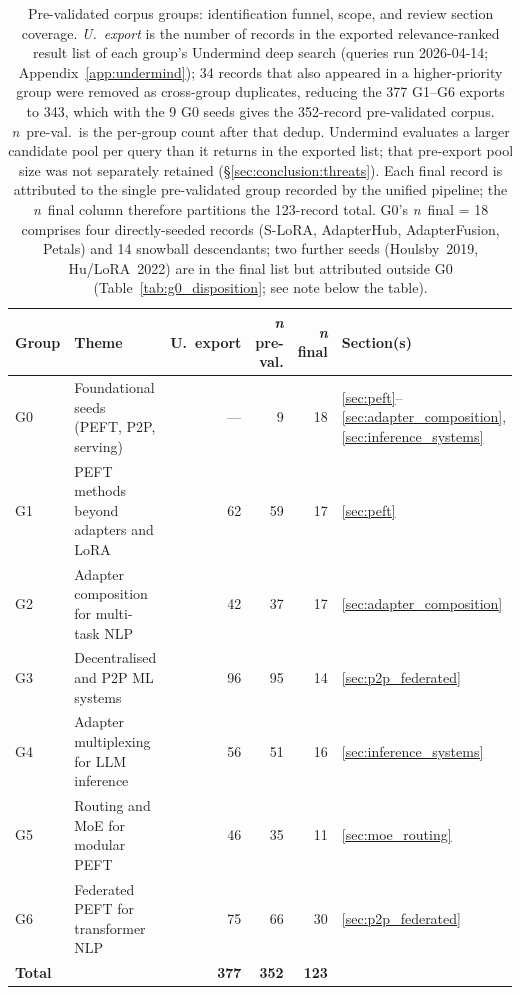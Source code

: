 \begin{table}[H]
\centering
\caption{Pre-validated corpus groups: identification funnel, scope, and review section coverage. \emph{U.\ export} is the number of records in the exported relevance-ranked result list of each group's Undermind deep search (queries run 2026-04-14; Appendix~\ref{app:undermind}); 34 records that also appeared in a higher-priority group were removed as cross-group duplicates, reducing the 377 G1--G6 exports to 343, which with the 9 G0 seeds gives the 352-record pre-validated corpus. \emph{n}~pre-val.\ is the per-group count after that dedup. Undermind evaluates a larger candidate pool per query than it returns in the exported list; that pre-export pool size was not separately retained (\S\ref{sec:conclusion:threats}). Each final record is attributed to the single pre-validated group recorded by the unified pipeline; the \emph{n}~final column therefore partitions the 123-record total. G0's \emph{n}~final = 18 comprises four directly-seeded records (S-LoRA, AdapterHub, AdapterFusion, Petals) and 14 snowball descendants; two further seeds (Houlsby~2019, Hu/LoRA~2022) are in the final list but attributed outside G0 (Table~\ref{tab:g0_disposition}; see note below the table).}
\label{tab:groups}
\begin{tabular}{lp{4.4cm}rrrl}
\toprule
\textbf{Group} & \textbf{Theme} & \textbf{U.\ export} & \textbf{\textit{n} pre-val.} &
\textbf{\textit{n} final} & \textbf{Section(s)} \\
\midrule
G0 & Foundational seeds (PEFT, P2P, serving) & ---  & 9   & 18  &
\ref{sec:peft}--\ref{sec:adapter_composition}, \ref{sec:inference_systems} \\
G1 & PEFT methods beyond adapters and LoRA   & 62  & 59  & 17  & \ref{sec:peft} \\
G2 & Adapter composition for multi-task NLP  & 42  & 37  & 17  &
\ref{sec:adapter_composition} \\
G3 & Decentralised and P2P ML systems        & 96  & 95  & 14  &
\ref{sec:p2p_federated} \\
G4 & Adapter multiplexing for LLM inference  & 56  & 51  & 16  &
\ref{sec:inference_systems} \\
G5 & Routing and MoE for modular PEFT        & 46  & 35  & 11  &
\ref{sec:moe_routing} \\
G6 & Federated PEFT for transformer NLP      & 75  & 66  & 30  &
\ref{sec:p2p_federated} \\
\midrule
\textbf{Total} & & \textbf{377} & \textbf{352} & \textbf{123} & \\

\end{tabular}
\end{table}
